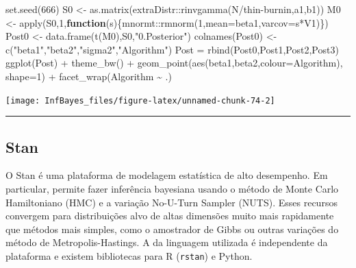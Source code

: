 \documentclass[
]{book}
\newenvironment{Shaded}{\begin{snugshade}}{\end{snugshade}}
\newcommand{\AttributeTok}[1]{\textcolor[rgb]{0.77,0.63,0.00}{#1}}
\newcommand{\ControlFlowTok}[1]{\textcolor[rgb]{0.13,0.29,0.53}{\textbf{#1}}}
\newcommand{\DecValTok}[1]{\textcolor[rgb]{0.00,0.00,0.81}{#1}}
\newcommand{\FunctionTok}[1]{\textcolor[rgb]{0.00,0.00,0.00}{#1}}
\newcommand{\NormalTok}[1]{#1}
\newcommand{\OtherTok}[1]{\textcolor[rgb]{0.56,0.35,0.01}{#1}}
\newcommand{\SpecialCharTok}[1]{\textcolor[rgb]{0.00,0.00,0.00}{#1}}
\newcommand{\StringTok}[1]{\textcolor[rgb]{0.31,0.60,0.02}{#1}}
\begin{document}
\begin{Shaded}
\begin{Highlighting}[]
\FunctionTok{set.seed}\NormalTok{(}\DecValTok{666}\NormalTok{)}
\NormalTok{S0 }\OtherTok{\textless{}{-}} \FunctionTok{as.matrix}\NormalTok{(extraDistr}\SpecialCharTok{::}\FunctionTok{rinvgamma}\NormalTok{(N}\SpecialCharTok{/}\NormalTok{thin}\SpecialCharTok{{-}}\NormalTok{burnin,a1,b1))}
\NormalTok{M0 }\OtherTok{\textless{}{-}} \FunctionTok{apply}\NormalTok{(S0,}\DecValTok{1}\NormalTok{,}\ControlFlowTok{function}\NormalTok{(s)\{mnormt}\SpecialCharTok{::}\FunctionTok{rmnorm}\NormalTok{(}\DecValTok{1}\NormalTok{,}\AttributeTok{mean=}\NormalTok{beta1,}\AttributeTok{varcov=}\NormalTok{s}\SpecialCharTok{*}\NormalTok{V1)\})}
\NormalTok{Post0 }\OtherTok{\textless{}{-}} \FunctionTok{data.frame}\NormalTok{(}\FunctionTok{t}\NormalTok{(M0),S0,}\StringTok{"0.Posterior"}\NormalTok{)}
\FunctionTok{colnames}\NormalTok{(Post0) }\OtherTok{\textless{}{-}} \FunctionTok{c}\NormalTok{(}\StringTok{"beta1"}\NormalTok{,}\StringTok{"beta2"}\NormalTok{,}\StringTok{"sigma2"}\NormalTok{,}\StringTok{"Algorithm"}\NormalTok{)}
\NormalTok{Post }\OtherTok{=} \FunctionTok{rbind}\NormalTok{(Post0,Post1,Post2,Post3)}
\FunctionTok{ggplot}\NormalTok{(Post) }\SpecialCharTok{+} \FunctionTok{theme\_bw}\NormalTok{() }\SpecialCharTok{+}
  \FunctionTok{geom\_point}\NormalTok{(}\FunctionTok{aes}\NormalTok{(beta1,beta2,}\AttributeTok{colour=}\NormalTok{Algorithm), }\AttributeTok{shape=}\DecValTok{1}\NormalTok{) }\SpecialCharTok{+}
  \FunctionTok{facet\_wrap}\NormalTok{(Algorithm }\SpecialCharTok{\textasciitilde{}}\NormalTok{ .)}
\end{Highlighting}
\end{Shaded}

\begin{center}\texttt{[image: InfBayes\_files/figure-latex/unnamed-chunk-74-2]} \end{center}

\begin{center}\rule{0.5\linewidth}{0.5pt}\end{center}

\hypertarget{stan}{%
\subsection{Stan}\label{stan}}

O Stan é uma plataforma de modelagem estatística de alto desempenho. Em particular, permite fazer inferência bayesiana usando o método de Monte Carlo Hamiltoniano (HMC) e a variação No-U-Turn Sampler (NUTS). Esses recursos convergem para distribuições alvo de altas dimensões muito mais rapidamente que métodos mais simples, como o amostrador de Gibbs ou outras variações do método de Metropolis-Hastings. A da linguagem utilizada é independente da plataforma e existem bibliotecas para R (\texttt{rstan}) e Python.
\end{document}
